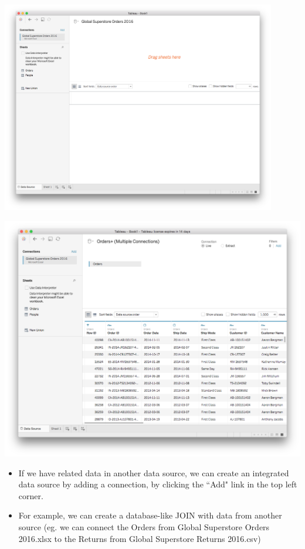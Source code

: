 \documentclass[xcolor=svgnames]{beamer} %
\begin{document}
\begin{frame}
\begin{center}
\includegraphics[width=0.9\textwidth]{img/datasource}
\end{center}
\end{frame}


\begin{frame}
\begin{center}
\includegraphics[width=.8\textwidth]{img/excel}
\end{center}
\end{frame}


\begin{frame}
\begin{itemize}

\item If we have {related} data in another data source, we can create an integrated data source by adding a connection, by clicking the ``Add" link in the top left corner.\vfill

\item For example, we can create a database-like JOIN with data from another source (eg. we can connect the Orders from Global Superstore Orders 2016.xlsx to the Returns from Global Superstore Returns 2016.csv)
\end{itemize}

\end{frame}
\end{document}
